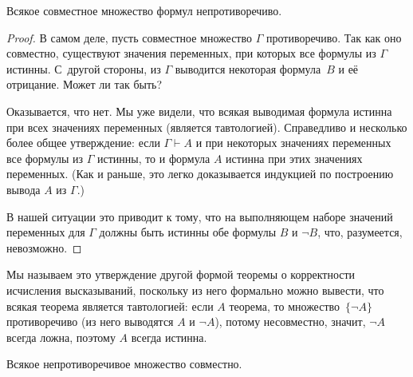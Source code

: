 \begin{theorem}
%
        \label{correctness-second-form}%
Всякое совместное множество формул непротиворечиво.
\end{theorem}

\begin{proof}
В самом деле, пусть совместное множество $\Gamma$ противоречиво.
Так как оно совместно, существуют значения переменных, при которых
все формулы из $\Gamma$ истинны. С~другой стороны, из $\Gamma$
выводится некоторая формула~$B$ и её отрицание. Может ли так быть?

Оказывается, что нет. Мы уже видели, что всякая выводимая
формула истинна при всех значениях переменных (является
тавтологией). Справедливо и несколько более общее утверждение:
если $\Gamma\vdash A$ и при некоторых значениях переменных
все формулы из
$\Gamma$ истинны, то и формула $A$ истинна при этих значениях
переменных. (Как и раньше, это легко доказывается индукцией по
построению вывода $A$ из $\Gamma$.)

В нашей ситуации это приводит к тому, что на выполняющем наборе
значений переменных для $\Gamma$ должны быть истинны обе формулы
$B$ и $\lnot B$, что, разумеется, невозможно.
\end{proof}

Мы называем это утверждение другой формой теоремы о корректности
исчисления высказываний, поскольку из него формально можно
вывести, что всякая теорема является тавтологией: если $A$\т
теорема, то множество~$\{\lnot A\}$ противоречиво (из него
выводятся $A$ и $\lnot A$), потому несовместно, значит, $\lnot
A$ всегда ложна, поэтому $A$ всегда истинна.

\begin{theorem}
%
        \label{completeness-second-form}%
Всякое непротиворечивое множество сов\-местно.%
\end{theorem}

